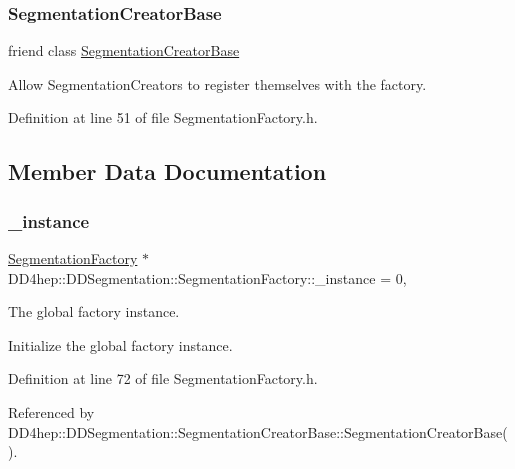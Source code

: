 \subsubsection{\texorpdfstring{Segmentation\+Creator\+Base}{SegmentationCreatorBase}}
{\footnotesize\ttfamily friend class \hyperlink{class_d_d4hep_1_1_d_d_segmentation_1_1_segmentation_creator_base}{Segmentation\+Creator\+Base}\hspace{0.3cm}{\ttfamily [friend]}}



Allow Segmentation\+Creators to register themselves with the factory. 



Definition at line 51 of file Segmentation\+Factory.\+h.



\subsection{Member Data Documentation}
\hypertarget{class_d_d4hep_1_1_d_d_segmentation_1_1_segmentation_factory_a1feb10e4594795939255eb57b80a76dd}{}\label{class_d_d4hep_1_1_d_d_segmentation_1_1_segmentation_factory_a1feb10e4594795939255eb57b80a76dd} 
\subsubsection{\texorpdfstring{\+\_\+instance}{\_instance}}
{\footnotesize\ttfamily \hyperlink{class_d_d4hep_1_1_d_d_segmentation_1_1_segmentation_factory}{Segmentation\+Factory} $\ast$ D\+D4hep\+::\+D\+D\+Segmentation\+::\+Segmentation\+Factory\+::\+\_\+instance = 0\hspace{0.3cm}{\ttfamily [static]}, {\ttfamily [private]}}



The global factory instance. 

Initialize the global factory instance. 

Definition at line 72 of file Segmentation\+Factory.\+h.



Referenced by D\+D4hep\+::\+D\+D\+Segmentation\+::\+Segmentation\+Creator\+Base\+::\+Segmentation\+Creator\+Base().

